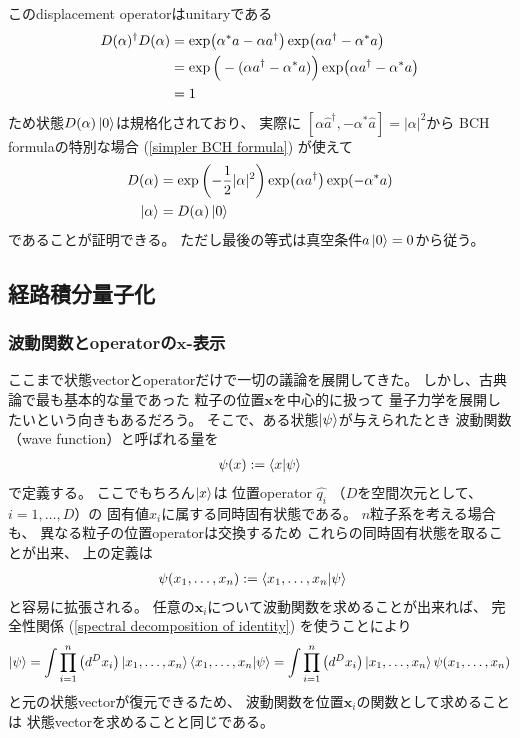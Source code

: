 このdisplacement operatorはunitaryである
\begin{align}
    D(\alpha)^\dagger D(\alpha) &=
    \exp(
        \alpha^* \hat{a}
        - \alpha \hat{a}^\dagger
    )
    \exp(
        \alpha\hat{a}^\dagger
        - \alpha^* \hat{a}
    )
\notag\\&=
    \exp\Big(
        - (
        \alpha \hat{a}^\dagger
        -
        \alpha^* \hat{a}
        )
    \Big)
    \exp(
        \alpha\hat{a}^\dagger
        - \alpha^* \hat{a}
    )
\notag\\&=
    1
\end{align}
ため状態$D(\alpha)\ket{0}$は規格化されており、
実際に
$[
    \alpha \hat{a}^\dagger,
     - \alpha^* \hat{a}
]
= |\alpha|^2$から
BCH formulaの特別な場合
(\ref{simpler BCH formula})
が使えて
\begin{align}
    D(\alpha) &= \exp\left(
        - \dfrac{1}{2}|\alpha|^2
    \right)
    \exp(\alpha \hat{a}^\dagger)
    \exp( - \alpha^* \hat{a})
\notag\\
    \ket{\alpha} &= D(\alpha) \ket{0}
\end{align}
であることが証明できる。
ただし最後の等式は真空条件$\hat{a}\ket{0}=0$から従う。

\subsection{経路積分量子化}

\subsubsection{波動関数とoperatorの$\bm{x}$-表示}

ここまで状態vectorとoperatorだけで一切の議論を展開してきた。
しかし、古典論で最も基本的な量であった
粒子の位置$\bm{x}$を中心的に扱って
量子力学を展開したいという向きもあるだろう。
そこで、ある状態$\ket{ \psi }$が与えられたとき
波動関数（wave function）と呼ばれる量を
\begin{align}
    \psi(\bm{x}) := \braket{ \bm{x} | \psi }
\end{align}
で定義する。
ここでもちろん$\ket{ \bm{x} }$は
位置operator $\hat{ q_i }$
（$D$を空間次元として、$i = 1,\dots,D$）の
固有値$x_i$に属する同時固有状態である。
$n$粒子系を考える場合も、
異なる粒子の位置operatorは交換するため
これらの同時固有状態を取ることが出来、
上の定義は
\begin{align}
    \psi(\bm{x}_1, \dots, \bm{x}_n)
    &:=
    \braket{ \bm{x}_1, \dots, \bm{x}_n | \psi }
\end{align}
と容易に拡張される。
任意の$\bm{x}_i$について波動関数を求めることが出来れば、
完全性関係
(\ref{spectral decomposition of identity})
を使うことにより
\begin{align}
    \ket{ \psi }
    =
    \int \prod_{i = 1}^n
    \left(
        d^D x_i
    \right)
    \ket{ \bm{x}_1, \dots, \bm{x}_n }
    \braket{ \bm{x}_1, \dots, \bm{x}_n | \psi }
    =
    \int \prod_{i = 1}^n
    \left(
        d^D x_i
    \right)
    \ket{ \bm{x}_1, \dots, \bm{x}_n }
    \psi( \bm{x}_1, \dots, \bm{x}_n )
\end{align}
と元の状態vectorが復元できるため、
波動関数を位置$\bm{x}_i$の関数として求めることは
状態vectorを求めることと同じである。

